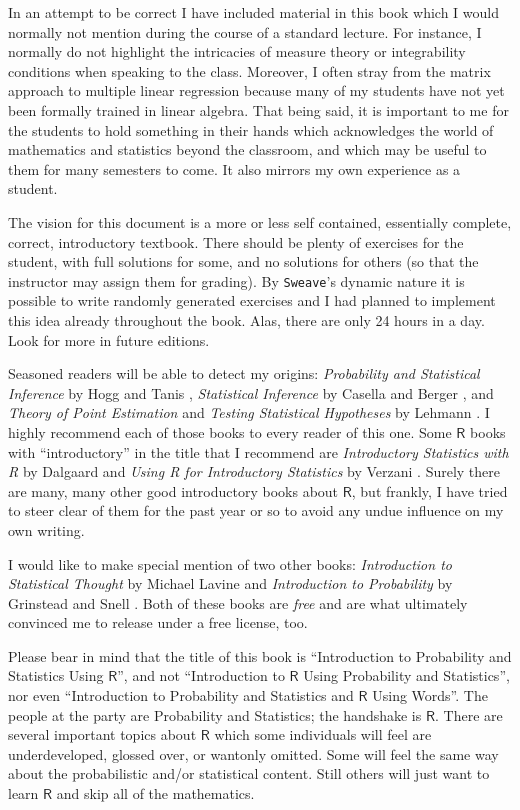 In an attempt to be correct I have included material in this book which I would normally not mention during the course of a standard lecture. For instance, I normally do not highlight the intricacies of measure theory or integrability conditions when speaking to the class. Moreover, I often stray from the matrix approach to multiple linear regression because many of my students have not yet been formally trained in linear algebra. That being said, it is important to me for the students to hold something in their hands which acknowledges the world of mathematics and statistics beyond the classroom, and which may be useful to them for many semesters to come. It also mirrors my own experience as a student.

The vision for this document is a more or less self contained, essentially complete, correct, introductory textbook. There should be plenty of exercises for the student, with full solutions for some, and no solutions for others (so that the instructor may assign them for grading). By \texttt{Sweave}'s dynamic nature it is possible to write randomly generated exercises and I had planned to implement this idea already throughout the book. Alas, there are only 24 hours in a day. Look for more in future editions.

Seasoned readers will be able to detect my origins: \emph{Probability and Statistical Inference} by Hogg and Tanis \cite{Hogg2006}, \emph{Statistical Inference} by Casella and Berger \cite{Casella2002}, and \emph{Theory of Point Estimation} and \emph{Testing Statistical Hypotheses} by Lehmann \cite{Lehmann1998,Lehmann1986}. I highly recommend each of those books to every reader of this one. Some \(\mathsf{R}\) books with ``introductory'' in the title that I recommend are \emph{Introductory Statistics with R} by Dalgaard \cite{Dalgaard2008} and \emph{Using R for Introductory Statistics} by Verzani \cite{Verzani2005}. Surely there are many, many other good introductory books about \(\mathsf{R}\), but frankly, I have tried to steer clear of them for the past year or so to avoid any undue influence on my own writing.

I would like to make special mention of two other books: \emph{Introduction to Statistical Thought} by Michael Lavine \cite{Lavine2009} and \emph{Introduction to Probability} by Grinstead and Snell \cite{Grinstead1997}. Both of these books are \emph{free} and are what ultimately convinced me to release \IPSUR under a free license, too.

Please bear in mind that the title of this book is ``Introduction to Probability and Statistics Using \(\mathsf{R}\)'', and not ``Introduction to \(\mathsf{R}\) Using Probability and Statistics'', nor even ``Introduction to Probability and Statistics and \(\mathsf{R}\) Using Words''. The people at the party are Probability and Statistics; the handshake is \(\mathsf{R}\). There are several important topics about \(\mathsf{R}\) which some individuals will feel are underdeveloped, glossed over, or wantonly omitted. Some will feel the same way about the probabilistic and/or statistical content. Still others will just want to learn \(\mathsf{R}\) and skip all of the mathematics.

